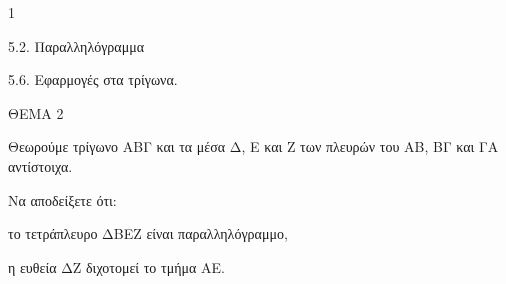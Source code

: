 \begin{ylh}{1}
    \item 5.2. Παραλληλόγραμμα
    \item 5.6. Εφαρμογές στα τρίγωνα.
\end{ylh}

ΘΕΜΑ 2

Θεωρούμε τρίγωνο ΑΒΓ και τα μέσα Δ, Ε και Ζ των πλευρών του ΑΒ, ΒΓ και ΓΑ αντίστοιχα.

Να αποδείξετε ότι:

\begin{alist}
\item το τετράπλευρο ΔΒΕΖ είναι παραλληλόγραμμο, 

\item η ευθεία ΔΖ διχοτομεί το τμήμα ΑΕ. 
\end{alist}
